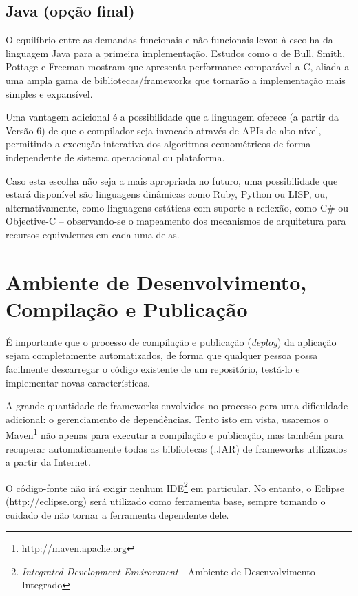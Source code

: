 \documentclass{abnt}
\begin{document}
\subsection{Java (opção final)}
O equilíbrio entre as demandas funcionais e não-funcionais levou à escolha da linguagem Java para a primeira implementação. Estudos como o de Bull, Smith, Pottage e Freeman\cite{BullSmithPottageFreeman} mostram que apresenta performance comparável a C, aliada a uma ampla gama de bibliotecas/frameworks que tornarão a implementação mais simples e expansível.

Uma vantagem adicional é a possibilidade que a linguagem oferece (a partir da Versão 6) de que o compilador seja invocado através de APIs de alto nível, permitindo a execução interativa dos algoritmos econométricos de forma independente de sistema operacional ou plataforma.

Caso esta escolha não seja a mais apropriada no futuro, uma possibilidade que estará disponível são  linguagens dinâmicas como Ruby, Python ou LISP, ou, alternativamente, como linguagens estáticas com suporte a reflexão, como C\# ou Objective-C – observando-se o mapeamento dos mecanismos de arquitetura para recursos equivalentes em cada uma delas.

\section{Ambiente de Desenvolvimento, Compilação e Publicação}

É importante que o processo de compilação e publicação (\textit{deploy}) da aplicação sejam completamente automatizados, de forma que qualquer pessoa possa facilmente descarregar o código existente de um repositório, testá-lo e implementar novas características.

A grande quantidade de frameworks envolvidos no processo gera uma dificuldade adicional: o gerenciamento de dependências. Tento isto em vista, usaremos o Maven\footnote{\url{http://maven.apache.org}} não apenas para executar a compilação e publicação, mas também para recuperar automaticamente todas as bibliotecas (.JAR) de frameworks utilizados a partir da Internet.

O código-fonte não irá exigir nenhum IDE\footnote{\textit{Integrated Development Environment} - Ambiente de Desenvolvimento Integrado} em particular. No entanto, o Eclipse (\url{http://eclipse.org}) será utilizado como ferramenta base, sempre tomando o cuidado de não tornar a ferramenta dependente dele. 
\end{document}
